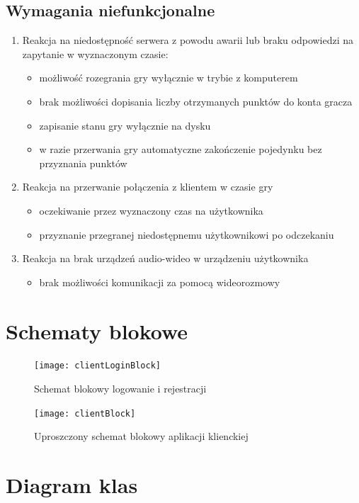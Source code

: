 \documentclass[12pt]{article}
\begin{document}
\subsection{Wymagania niefunkcjonalne}
\begin{enumerate}
\item Reakcja na niedostępność serwera z powodu awarii lub braku odpowiedzi na zapytanie w wyznaczonym czasie:
\begin{itemize}
\item możliwość rozegrania gry wyłącznie w trybie z komputerem
\item brak możliwości dopisania liczby otrzymanych punktów do konta gracza
\item zapisanie stanu gry wyłącznie na dysku
\item w razie przerwania gry automatyczne zakończenie pojedynku bez przyznania punktów 
\end{itemize}

\item Reakcja na przerwanie połączenia z klientem w czasie gry
\begin{itemize}
\item oczekiwanie przez wyznaczony czas na użytkownika
\item przyznanie przegranej niedostępnemu użytkownikowi po odczekaniu
\end{itemize}

\item Reakcja na brak urządzeń audio-wideo w urządzeniu użytkownika
\begin{itemize}
\item brak możliwości komunikacji za pomocą wideorozmowy
\end{itemize}
\end{enumerate}


\newpage
\section{Schematy blokowe}
\begin{figure}[!ht]
  \centering
	\texttt{[image: clientLoginBlock]}
	 \caption{Schemat blokowy logowanie i rejestracji}
\end{figure}
\pagebreak
\begin{figure}[!ht]
  \centering
	\texttt{[image: clientBlock]}
	 \caption{Uproszczony schemat blokowy aplikacji klienckiej}
\end{figure}

\newpage

\section{Diagram klas}
\end{document}
